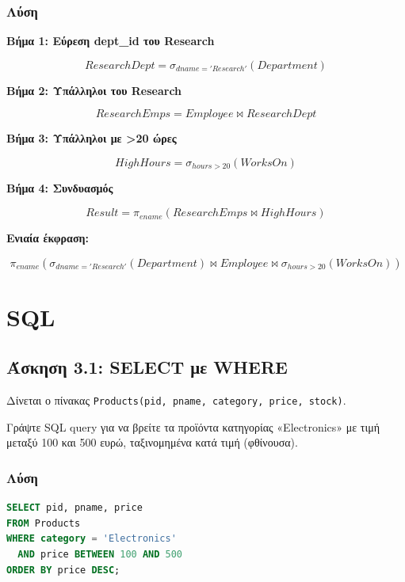 \subsubsection*{Λύση}

\textbf{Βήμα 1: Εύρεση dept\_id του Research}

$$ResearchDept = \sigma_{dname='Research'}(Department)$$

\textbf{Βήμα 2: Υπάλληλοι του Research}

$$ResearchEmps = Employee \bowtie ResearchDept$$

\textbf{Βήμα 3: Υπάλληλοι με >20 ώρες}

$$HighHours = \sigma_{hours > 20}(WorksOn)$$

\textbf{Βήμα 4: Συνδυασμός}

$$Result = \pi_{ename}(ResearchEmps \bowtie HighHours)$$

\textbf{Ενιαία έκφραση:}

$$\pi_{ename}(\sigma_{dname='Research'}(Department) \bowtie Employee \bowtie \sigma_{hours>20}(WorksOn))$$


\section{SQL}

\subsection{Άσκηση 3.1: SELECT με WHERE}

\begin{formulabox}[Εκφώνηση]
Δίνεται ο πίνακας \texttt{Products(pid, pname, category, price, stock)}.

Γράψτε SQL query για να βρείτε τα προϊόντα κατηγορίας «Electronics» με τιμή μεταξύ
100 και 500 ευρώ, ταξινομημένα κατά τιμή (φθίνουσα).
\end{formulabox}

\subsubsection*{Λύση}

\begin{lstlisting}[language=SQL]
SELECT pid, pname, price
FROM Products
WHERE category = 'Electronics'
  AND price BETWEEN 100 AND 500
ORDER BY price DESC;
\end{lstlisting}

